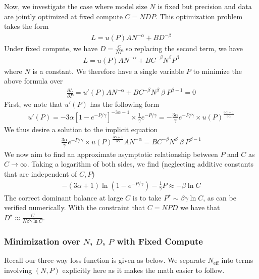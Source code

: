\documentclass[11pt]{article}
\begin{document}
Now, we investigate the case where model size $N$ is fixed but precision and data are jointly optimized at fixed compute $C= N D P$. This optimization problem takes the form
\begin{align}
    L = u(P) A N^{-\alpha} + B D^{-\beta} 
\end{align}
Under fixed compute, we have $D = \frac{C}{NP}$ so replacing the second term, we have
\begin{align}
    L = u(P) A N^{-\alpha} + B C^{-\beta} N^\beta P^\beta  
\end{align}
where $N$ is a constant. We therefore have a single variable $P$ to minimize the above formula over
\begin{align}
    \frac{\partial L}{\partial P} =  u'(P) A N^{-\alpha} + B C^{-\beta} N^\beta \ \beta \  P^{\beta - 1} = 0
\end{align}
First, we note that $u'(P)$ has the following form
\begin{align}
    u'(P) = - 3\alpha [1-e^{-P/\gamma}]^{-3\alpha - 1} \times \frac{1}{\gamma} e^{-P/\gamma} = - \frac{3\alpha }{\gamma} e^{-P/\gamma} \times u(P)^{ \frac{3\alpha+1}{3\alpha} }
\end{align}
We thus desire a solution to the implicit equation
\begin{align}
    \frac{ 3 \alpha }{\gamma} e^{-P/\gamma} \times u(P)^{ \frac{3\alpha+1}{3\alpha} }  A N^{-\alpha} =  B C^{-\beta} N^\beta \ \beta \  P^{\beta - 1} 
\end{align}
We now aim to find an approximate asymptotic relationship between $P$ and $C$ as $C \to \infty$. Taking a logarithm of both sides, we find (neglecting additive constants that are independent of $C, P$)
\begin{align}
    - (3\alpha+1)\ln( 1 -e^{-P/\gamma} ) - \frac{1}{\gamma} P \approx - \beta \ln C 
\end{align}
The correct dominant balance at large $C$ is to take $P^\star \sim \beta\gamma \ln C$, as can be verified numerically. With the constraint that $C = N P D$ we have that $D^\star \approx \frac{C}{N \beta \gamma 
\ln C}$. 


\subsubsection{Minimization over \texorpdfstring{$N$}{N}, \texorpdfstring{$D$}{D}, \texorpdfstring{$P$}{P} with Fixed Compute}


Recall our three-way loss function is given as below. We separate $N_\text{eff}$ into terms involving $(N, P)$ explicitly here as it makes the math easier to follow. 
\end{document}
